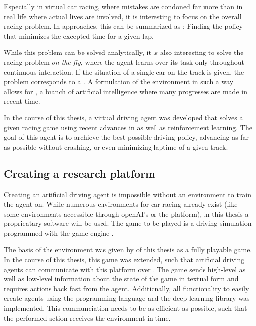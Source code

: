 Especially in virtual car racing, where mistakes are condoned far more than in real life where actual lives are involved, it is interesting to focus on the overall racing problem. In  approaches, this can be summarized as : Finding the policy that minimizes the excepted time for a given lap. 

While this problem can be solved analytically, it is also interesting to solve the racing problem \textit{on the fly}, where the agent learns over its task only throughout continuous interaction. If the situation of a single car on the track is given, the problem corresponds to a . A formulation of the environment in such a way allows for , a branch of artificial intelligence where many progresses are made in recent time.

In the course of this thesis, a virtual driving agent was developed that solves a given racing game using recent advances in  as well as reinforcement learning. The goal of this agent is to archieve the best possible driving policy, advancing as far as possible without crashing, or even minimizing laptime of a given track. 

\subsection{Creating a research platform}

Creating an artificial driving agent is impossible without an environment to train the agent on. While numerous environments for car racing already exist (like some environments accessible through openAI's  or the  platform), in this thesis a proprieatary software will be used. The game to be played is a driving simulation programmed with the game engine . 

The basis of the environment was given by \leon of this thesis as a fully playable game. In the course of this thesis, this game was extended, such that artificial driving agents can communicate with this platform over . The game sends high-level as well as low-level information about the state of the game in textual form and requires actions back fast from the agent. Additionally, all functionality to easily create agents using the programming language  and the deep learning library  was implemented. This communciation needs to be as efficient as possible, such that the performed action receives the environment in time.


